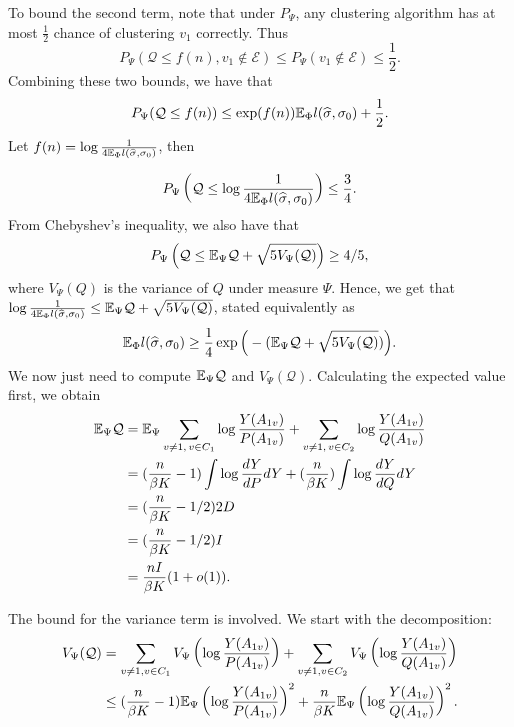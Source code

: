 \documentclass{article}
\begin{document}
To bound the second term, note that under $P_{\Psi}$, any clustering algorithm has at most $\frac{1}{2}$ chance of clustering $v_1$ correctly. Thus
\[
P_{\Psi}(\mathcal{Q} \leq f(n), v_1 \notin \mathcal{E}) \leq P_{\Psi}(v_1 \notin \mathcal{E}) \leq \frac{1}{2}.
\]
Combining these two bounds, we have that
\[
P_{\Psi}(\mathcal{Q} \leq f(n)) \leq \exp(f(n)) {\mathbb E}_{\Phi} l(\widehat{\sigma}, \sigma_0) + \frac{1}{2}.
\]
Let $f(n) = \log \frac{1}{4 {\mathbb E}_{\Phi} l(\widehat{\sigma}, \sigma_0)}$, then 

\[
P_{\Psi}\left(\mathcal{Q} \leq \log \frac{1}{4 {\mathbb E}_{\Phi} l(\widehat{\sigma}, \sigma_0)} \right) \leq \frac{3}{4}.
\]
From Chebyshev's inequality, we also have that
\[
P_{\Psi}\left( \mathcal{Q} \leq {\mathbb E}_{\Psi} \mathcal{Q} + \sqrt{ 5 V_{\Psi}(\mathcal{Q})} \right) \geq 4/5,
\]
where $V_\Psi(Q)$ is the variance of $Q$ under measure $\Psi$. Hence, we get that $\log \frac{1}{4 {\mathbb E}_{\Phi} l(\widehat{\sigma},\sigma_0)} \leq {\mathbb E}_{\Psi} \mathcal{Q} + \sqrt{ 5 V_{\Psi}(\mathcal{Q})}$, stated equivalently as
\[
{\mathbb E}_{\Phi} l(\widehat{\sigma}, \sigma_0) \geq \frac{1}{4} \exp\Big( - ({\mathbb E}_{\Psi} \mathcal{Q} + \sqrt{ 5 V_{\Psi}(\mathcal{Q})} ) \Big).
\]
We now just need to compute ${\mathbb E}_{\Psi} \mathcal{Q}$ and $V_{\Psi}(\mathcal{Q})$. Calculating the expected value first, we obtain
\begin{align*}
{\mathbb E}_{\Psi} \mathcal{Q} &= {\mathbb E}_{\Psi}  \sum_{v \neq 1,\, v \in C_1} \log \frac{Y(A_{1v})}{P(A_{1v})} + \sum_{v \neq 1,\, v \in C_2} \log \frac{Y(A_{1v})}{Q(A_{1v})}  \\
     &= (\frac{n}{\beta K} - 1) \int \log \frac{dY}{dP} dY + (\frac{n}{\beta K}) \int \log \frac{dY}{dQ} dY \\
     &= (\frac{n}{\beta K} - 1/2) 2 D\\
     &= (\frac{n}{\beta K} - 1/2) I \\
     &= \frac{nI}{\beta K} (1 + o(1)). 
\end{align*}




The bound for the variance term is involved. We start with the decomposition:
\begin{align*}
V_{\Psi}(\mathcal{Q}) &= \sum_{v \neq 1, v\in C_1} V_{\Psi} \left( \log \frac{Y(A_{1v})}{P(A_{1v})} \right) +
                        \sum_{v \neq 1, v\in C_2} V_{\Psi} \left( \log \frac{Y(A_{1v})}{Q(A_{1v})} \right)  \\
   &\leq (\frac{n}{\beta K} - 1) {\mathbb E}_{\Psi} \left( \log \frac{Y(A_{1v})}{P(A_{1v})} \right)^2 + 
         \frac{n}{\beta K} {\mathbb E}_{\Psi} \left( \log \frac{Y(A_{1v})}{Q(A_{1v})} \right)^2. 
\end{align*}
\end{document}
